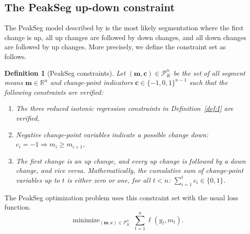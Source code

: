 \documentclass{article}
\newtheorem{definition}{Definition}
\DeclareMathOperator*{\minimize}{minimize}
\newcommand{\RR}{\mathbb R}
\begin{document}
\subsection{The PeakSeg up-down constraint}
\label{sec:PeakSeg}

The PeakSeg model described by \citet{HOCKING-PeakSeg} is the most
likely segmentation where the first change is up, all up changes are
followed by down changes, and all down changes are followed by up
changes. More precisely, we define the constraint set as follows.
\begin{definition}[PeakSeg constraints]
  \label{def:U}
  Let $(\mathbf m, \mathbf c)\in\mathcal P_K^n$ be the set of all
  segment means $\mathbf m\in\RR^n$ and change-point indicators
  $\mathbf c\in\{-1, 0,1\}^{n-1}$ such that the following constraints
  are verified:
  \begin{enumerate}
  \item The three reduced isotonic regression constraints in
    Definition~\ref{def:I} are verified,
  \item Negative change-point variables indicate a possible change down:
    $c_i = -1 \Rightarrow m_i \geq m_{i+1}$,
  \item The first change is an up change, and every up change is followed by a
    down change, and vice versa. Mathematically, the cumulative sum of
    change-point variables up to $t$ is either zero or one, for all $t<n$:
    $\sum_{i=1}^t c_i \in \{0, 1\}$.
  \end{enumerate}
\end{definition}
The PeakSeg
optimization problem uses this constraint set with the usual loss
function.
\begin{equation}
\label{eq:min_PeakSeg}
    \minimize_{
        (\mathbf m, \mathbf c)\in\mathcal P^n_K
      } \ 
\sum_{t=1}^n \ell(y_t, m_t).
\end{equation}
\end{document}
